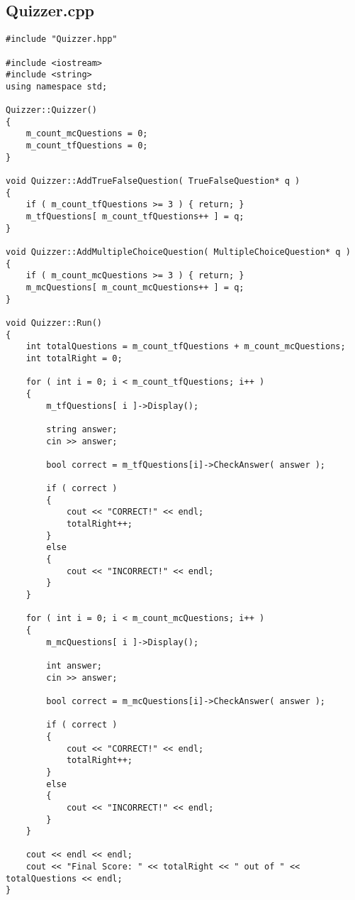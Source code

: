 \documentclass[a4paper,12pt]{book}
\begin{document}
            \subsection*{Quizzer.cpp}
\begin{lstlisting}[style=code]
#include "Quizzer.hpp"

#include <iostream>
#include <string>
using namespace std;

Quizzer::Quizzer()
{
    m_count_mcQuestions = 0;
    m_count_tfQuestions = 0;
}

void Quizzer::AddTrueFalseQuestion( TrueFalseQuestion* q )
{
    if ( m_count_tfQuestions >= 3 ) { return; }
    m_tfQuestions[ m_count_tfQuestions++ ] = q;
}

void Quizzer::AddMultipleChoiceQuestion( MultipleChoiceQuestion* q )
{
    if ( m_count_mcQuestions >= 3 ) { return; }
    m_mcQuestions[ m_count_mcQuestions++ ] = q;
}

void Quizzer::Run()
{
    int totalQuestions = m_count_tfQuestions + m_count_mcQuestions;
    int totalRight = 0;

    for ( int i = 0; i < m_count_tfQuestions; i++ )
    {
        m_tfQuestions[ i ]->Display();

        string answer;
        cin >> answer;

        bool correct = m_tfQuestions[i]->CheckAnswer( answer );

        if ( correct )
        {
            cout << "CORRECT!" << endl;
            totalRight++;
        }
        else
        {
            cout << "INCORRECT!" << endl;
        }
    }

    for ( int i = 0; i < m_count_mcQuestions; i++ )
    {
        m_mcQuestions[ i ]->Display();

        int answer;
        cin >> answer;

        bool correct = m_mcQuestions[i]->CheckAnswer( answer );

        if ( correct )
        {
            cout << "CORRECT!" << endl;
            totalRight++;
        }
        else
        {
            cout << "INCORRECT!" << endl;
        }
    }

    cout << endl << endl;
    cout << "Final Score: " << totalRight << " out of " << totalQuestions << endl;
}
\end{lstlisting}

            \newpage                    
\end{document}
